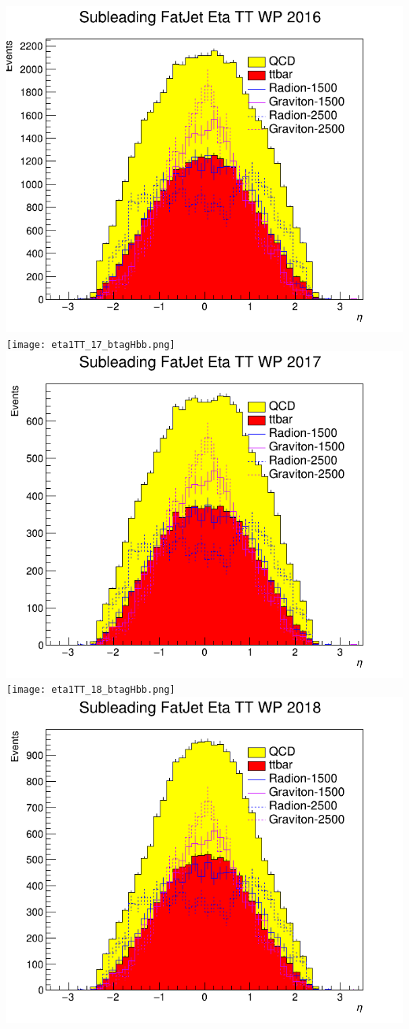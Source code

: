 \includegraphics[width=1\textwidth]{eta1TT_16_deepTagMD_HbbvsQCD.png}
\texttt{[image: eta1TT\_17\_btagHbb.png]}
\includegraphics[width=1\textwidth]{eta1TT_17_deepTagMD_HbbvsQCD.png}
\texttt{[image: eta1TT\_18\_btagHbb.png]}
\includegraphics[width=1\textwidth]{eta1TT_18_deepTagMD_HbbvsQCD.png}
